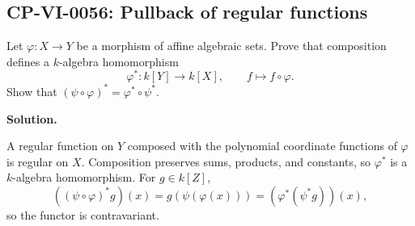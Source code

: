 
\subsection*{CP-VI-0056: Pullback of regular functions}

Let $\varphi:X\to Y$ be a morphism of affine algebraic sets. Prove that composition defines a $k$-algebra homomorphism
\[
\varphi^*:k[Y]\to k[X],\qquad f\mapsto f\circ\varphi.
\]
Show that $(\psi\circ\varphi)^*=\varphi^*\circ\psi^*$.

\medskip
\noindent\textbf{Solution.}

A regular function on $Y$ composed with the polynomial coordinate functions of $\varphi$ is regular on $X$. Composition preserves sums, products, and constants, so $\varphi^*$ is a $k$-algebra homomorphism. For $g\in k[Z]$,
\[
((\psi\circ\varphi)^*g)(x)=g(\psi(\varphi(x)))=(\varphi^*(\psi^*g))(x),
\]
so the functor is contravariant.
